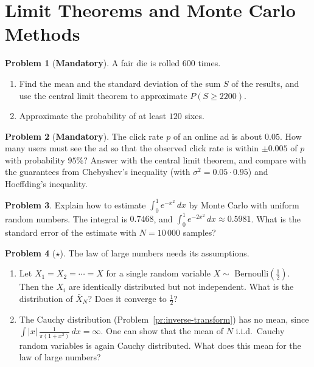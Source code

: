 \documentclass[11pt]{article}
\theoremstyle{definition}
\newtheorem{problem}{Problem}[section]
\newcommand{\mandatory}{\textcolor{red!70!black}{\textbf{Mandatory}}}
\begin{document}
\section{Limit Theorems and Monte Carlo Methods}

\begin{problem}[\mandatory]\label{pr:clt-dice}
    A fair die is rolled $600$ times.
    \begin{enumerate}[label=(\alph*)]
        \item Find the mean and the standard deviation of the sum $S$ of the results, and use the central limit theorem to approximate $P(S \geq 2200)$.
        \item Approximate the probability of at least $120$ sixes.
    \end{enumerate}
\end{problem}

\begin{problem}[\mandatory]\label{pr:sample-size}
    The click rate $p$ of an online ad is about $0.05$. How many users must see the ad so that the observed click rate is within $\pm 0.005$ of $p$ with probability $95\%$? Answer with the central limit theorem, and compare with the guarantees from Chebyshev's inequality (with $\sigma^2 = 0.05 \cdot 0.95$) and Hoeffding's inequality.
\end{problem}

\begin{problem}\label{pr:monte-carlo-integral}
    Explain how to estimate $\int_0^1 e^{-x^2}\, dx$ by Monte Carlo with uniform random numbers. The integral is $0.7468$, and $\int_0^1 e^{-2x^2}\, dx \approx 0.5981$. What is the standard error of the estimate with $N = 10\,000$ samples?
\end{problem}

\begin{problem}[$\star$]\label{pr:lln-fails}
    The law of large numbers needs its assumptions.
    \begin{enumerate}[label=(\alph*)]
        \item Let $X_1 = X_2 = \cdots = X$ for a single random variable $X \sim$ Bernoulli$(\frac{1}{2})$. Then the $X_i$ are identically distributed but not independent. What is the distribution of $\bar X_N$? Does it converge to $\frac{1}{2}$?
        \item The Cauchy distribution (Problem~\ref{pr:inverse-transform}) has no mean, since $\int |x|\,\frac{1}{\pi(1 + x^2)}\, dx = \infty$. One can show that the mean of $N$ i.i.d.\ Cauchy random variables is again Cauchy distributed. What does this mean for the law of large numbers?
    \end{enumerate}
\end{problem}
\end{document}
